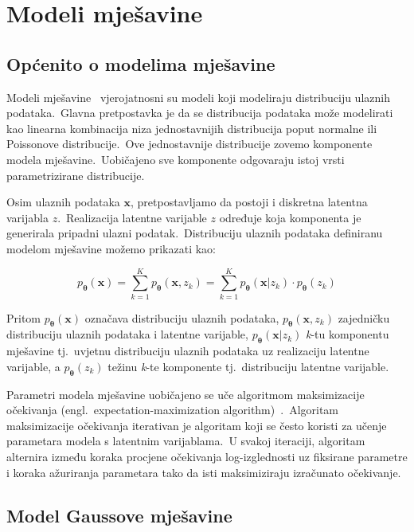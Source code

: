 \documentclass[times, utf8, seminar, numeric]{fer}
\begin{document}
\chapter{Modeli mješavine}

\section{Općenito o modelima mješavine}

Modeli mješavine~\cite{lindsay1995mixture} vjerojatnosni su modeli koji modeliraju distribuciju ulaznih podataka.\ 
Glavna pretpostavka je da se distribucija podataka može modelirati kao linearna kombinacija niza jednostavnijih distribucija poput normalne ili Poissonove distribucije.\ 
Ove jednostavnije distribucije zovemo komponente modela mješavine.\ Uobičajeno sve komponente odgovaraju istoj vrsti parametrizirane distribucije.\ 
  
Osim ulaznih podataka $\bm{x}$, pretpostavljamo da postoji i diskretna latentna varijabla $z$.\ Realizacija latentne varijable $z$ određuje koja komponenta je generirala pripadni ulazni podatak.\ 
Distribuciju ulaznih podataka definiranu modelom mješavine možemo prikazati kao:

\begin{equation}
    p_{\bm{\theta}}(\bm{x}) = \sum_{k=1}^{K} p_{\bm{\theta}}(\bm{x}, z_k) = \sum_{k=1}^{K} p_{\bm{\theta}}(\bm{x}|z_k) \cdot p_{\bm{\theta}}(z_k)
    \label{eq:mixture_model}
\end{equation}

Pritom $p_{\bm{\theta}}(\bm{x})$ označava distribuciju ulaznih podataka, $p_{\bm{\theta}}(\bm{x}, z_k)$ zajedničku distribuciju ulaznih podataka i latentne varijable, $p_{\bm{\theta}}(\bm{x}|z_k)$ \textit{k}-tu komponentu mješavine tj.\ uvjetnu distribuciju ulaznih podataka uz realizaciju latentne varijable, a $p_{\bm{\theta}}(z_k)$ težinu \textit{k}-te komponente tj.\ distribuciju latentne varijable.\
  
Parametri modela mješavine uobičajeno se uče algoritmom maksimizacije očekivanja (engl.\ expectation-maximization algorithm)~\cite{moon1996expectation}.\ 
Algoritam maksimizacije očekivanja iterativan je algoritam koji se često koristi za učenje parametara modela s latentnim varijablama.\ 
U svakoj iteraciji, algoritam alternira između koraka procjene očekivanja log-izglednosti uz fiksirane parametre i koraka ažuriranja parametara tako da isti maksimiziraju izračunato očekivanje.\ 

\section{Model Gaussove mješavine}
\end{document}
